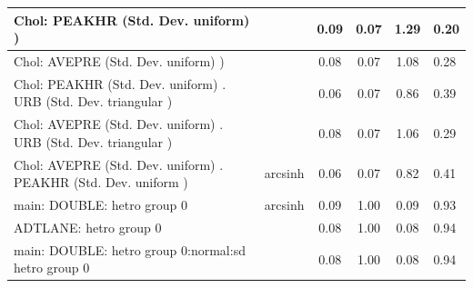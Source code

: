 \begin{table}
\begin{center}
\begin{tabular}{|l|l|c|c|c|l|}
			\hline
			 Chol: PEAKHR (Std. Dev. uniform) ) &  & 0.09 & 0.07 & 1.29 & 0.20 \\
			\hline
			 Chol: AVEPRE (Std. Dev. uniform) ) &  & 0.08 & 0.07 & 1.08 & 0.28 \\
			\hline
			 Chol: PEAKHR (Std. Dev. uniform) . URB (Std. Dev.   triangular ) &  & 0.06 & 0.07 & 0.86 & 0.39 \\
			\hline
			 Chol: AVEPRE (Std. Dev. uniform) . URB (Std. Dev.   triangular ) &  & 0.08 & 0.07 & 1.06 & 0.29 \\
			\hline
			 Chol: AVEPRE (Std. Dev. uniform) . PEAKHR (Std. Dev.   uniform ) & arcsinh & 0.06 & 0.07 & 0.82 & 0.41 \\
			\hline
			main: DOUBLE: hetro group 0 & arcsinh & 0.09 & 1.00 & 0.09 & 0.93 \\
			\hline
			ADTLANE: hetro group 0 &  & 0.08 & 1.00 & 0.08 & 0.94 \\
			\hline
			main: DOUBLE: hetro group 0:normal:sd  hetro group 0 &  & 0.08 & 1.00 & 0.08 & 0.94 \\
			\hline
		\end{tabular}
	\end{center}
\end{table}